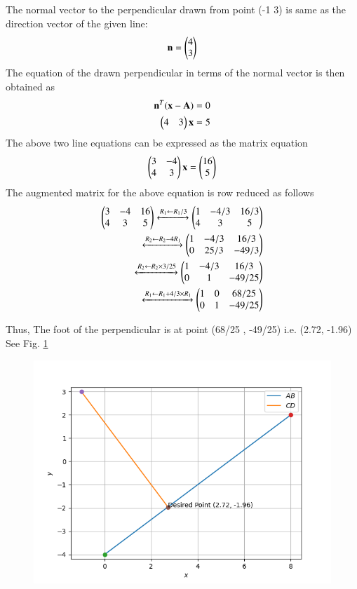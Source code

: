  
The normal vector to the perpendicular drawn from point (-1 3) is same as the direction vector of the given line:
\begin{align}
\textbf{n}=\begin{pmatrix}4 \\ 3\end{pmatrix}
\end{align}
The equation of the drawn perpendicular in terms of the normal vector is then obtained as
\begin{align}
\textbf{n}^T (\textbf{x}-\textbf{A})=0 \\
\begin{pmatrix}4 & 3\end{pmatrix}\textbf{x}=5
\end{align}
The above two line equations can be expressed as the matrix equation
\begin{align}
\begin{pmatrix}3 & -4\\4 & 3 \end{pmatrix}\textbf{x} = \begin{pmatrix}16\\5 \end{pmatrix}
\end{align}
The augmented matrix for the above equation is row reduced as follows
\begin{align}
\begin{pmatrix}3 & -4 & 16\\4 & 3 & 5\end{pmatrix}
\xleftrightarrow[]{R_1\leftarrow R_1/3}
\begin{pmatrix}1 & -4/3 & 16/3\\4 & 3 & 5\end{pmatrix}\\
\xleftrightarrow[]{R_2\leftarrow R_2-4R_1}   
\begin{pmatrix}1 & -4/3 & 16/3\\0 & 25/3 & -49/3\end{pmatrix}\\
\xleftrightarrow[]{R_2\leftarrow R_2\times3/25}
\begin{pmatrix}1 & -4/3 & 16/3\\0 & 1 & -49/25\end{pmatrix}\\
\xleftrightarrow[]{R_1\leftarrow R_1+4/3\times R_1}
\begin{pmatrix}1 & 0 & 68/25\\0 & 1 & -49/25\end{pmatrix}
\end{align}

Thus, The foot of the perpendicular is at point (68/25 , -49/25) i.e. (2.72, -1.96)
See Fig. \ref{fig:sol_line_plane_42}

\begin{figure}
\centering
\includegraphics[width=\columnwidth]{./solutions/line_plane/42/Figure_1.png}
\caption{}
\label{fig:sol_line_plane_42}
\end{figure}

